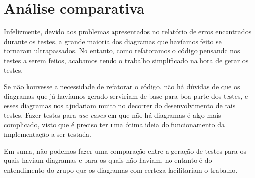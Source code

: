 \section{Análise comparativa}

Infelizmente, devido aos problemas apresentados no relatório de erros encontrados
durante os testes, a grande maioria dos diagramas que havíamos feito se tornaram
ultrapassados. No entanto, como refatoramos o código pensando nos testes a serem
feitos, acabamos tendo o trabalho simplificado na hora de gerar os testes.

Se não houvesse a necessidade de refatorar o código, não há dúvidas de que os
diagramas que já havíamos gerado serviriam de base para boa parte dos testes, e
esses diagramas nos ajudariam muito no decorrer do desenvolvimento de tais testes.
Fazer testes para \emph{use-cases} em que não há diagramas é algo mais complicado,
visto que é preciso ter uma ótima ideia do funcionamento da implementação a ser
testada.

Em suma, não podemos fazer uma comparação entre a geração de testes para os quais
haviam diagramas e para os quais não haviam, no entanto é do entendimento do grupo
que os diagramas com certeza facilitariam o trabalho.
